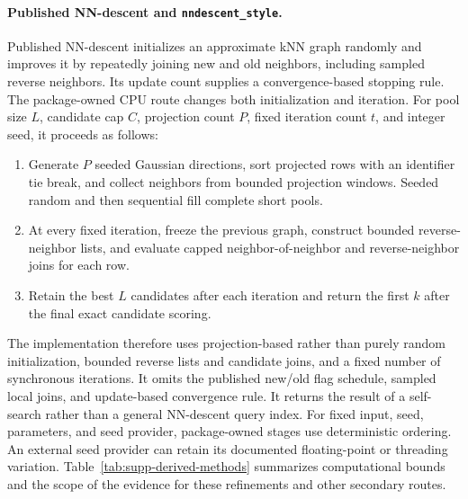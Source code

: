 \documentclass[11pt]{article}
\newcommand{\code}[1]{\texttt{#1}}
\begin{document}
\paragraph{Published NN-descent and \code{nndescent\_style}.}
Published NN-descent initializes an approximate kNN graph randomly and improves
it by repeatedly joining new and old neighbors, including sampled reverse
neighbors. Its update count supplies a convergence-based stopping rule. The
package-owned CPU route changes both initialization and iteration. For pool
size $L$, candidate cap $C$, projection count $P$, fixed iteration count $t$,
and integer seed, it proceeds as follows:
\begin{enumerate}
\item Generate $P$ seeded Gaussian directions, sort projected rows with an
      identifier tie break, and collect neighbors from bounded projection
      windows. Seeded random and then sequential fill complete short pools.
\item At every fixed iteration, freeze the previous graph, construct bounded
      reverse-neighbor lists, and evaluate capped neighbor-of-neighbor and
      reverse-neighbor joins for each row.
\item Retain the best $L$ candidates after each iteration and return the first
      $k$ after the final exact candidate scoring.
\end{enumerate}
The implementation therefore uses projection-based rather than purely random
initialization, bounded reverse lists and candidate joins, and a fixed number
of synchronous iterations. It omits the published new/old flag schedule,
sampled local joins, and update-based convergence rule. It returns the result
of a self-search rather than a general NN-descent query index. For fixed input,
seed, parameters, and seed provider, package-owned stages use deterministic
ordering. An external seed provider can retain its documented floating-point
or threading variation.
Table~\ref{tab:supp-derived-methods} summarizes computational bounds and the
scope of the evidence for these refinements and other secondary routes.
\end{document}

